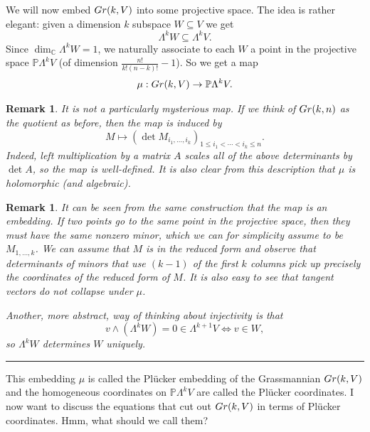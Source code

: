 \documentclass[11pt]{article}
\numberwithin{equation}{section}
\numberwithin{footnote}{section}
\newtheorem{rem}[thm]{Remark}
\newcommand{\blue}{\color{blue}}
\newcommand{\Gr}{{\rm Gr}}
\renewcommand{\P}{{\mathbb P}}
\newcommand{\C}{{\mathbb C}}
\begin{document}
\smallskip{\blue \hrule}

We will now  embed $\Gr(k,V)$ into some projective space.
The idea is rather elegant: given a dimension $k$ subspace $W\subseteq V$ we get
$$
\Lambda^k W \subseteq \Lambda^k V.
$$
Since $\dim_\C \Lambda^k W=1$, we naturally associate to each $W$ a point in the projective space 
$\P\Lambda^k V$ (of dimension $\frac {n!}{k!(n-k)!}-1$). So we get a map 
$$
\mu:\Gr(k,V)\to \P\Lambda^k V.
$$

\begin{rem}
It is not a particularly mysterious map. 
If we think of $\Gr(k,n)$ as the quotient as before, then
the map is induced by 
$$
M\mapsto \left(\det M_{i_1,\ldots,i_k}\right)_{1\leq i_1<\cdots <i_k\leq n}.
$$
Indeed, left multiplication by a matrix $A$ scales all of the above determinants by $\det A$, so the map is well-defined.
It is also clear from this description that $\mu$ is holomorphic (and algebraic).
\end{rem}


\smallskip
\begin{rem}
It can be seen from the same construction that the map is an embedding. If two points go to the same point in the projective space, then they must have the same nonzero minor, which we can for simplicity assume to be $M_{1,\ldots, k}$. We can assume that $M$ is in the reduced form and observe that determinants of minors that use $(k-1)$ of the first $k$ columns pick up precisely the coordinates of the reduced form of $M$. It is also easy to see that tangent vectors do not collapse under $\mu$. 

Another, more abstract, way of thinking about injectivity is that 
$$
v \wedge (\Lambda^k W) = 0\in \Lambda^{k+1}V \iff v \in W,
$$
so $\Lambda^k W$ determines $W$ uniquely.
\end{rem}

\smallskip
{\blue \hrule}
This embedding $\mu$ is called the {\blue Pl\"ucker embedding} of the Grassmannian $\Gr(k,V)$ and 
the homogeneous coordinates on $\P \Lambda^k V$ are called the {\blue Pl\"ucker coordinates}. I now want to discuss the 
equations that cut out $\Gr(k,V)$ in terms of Pl\"ucker coordinates. Hmm, what should we call them?
\end{document}
